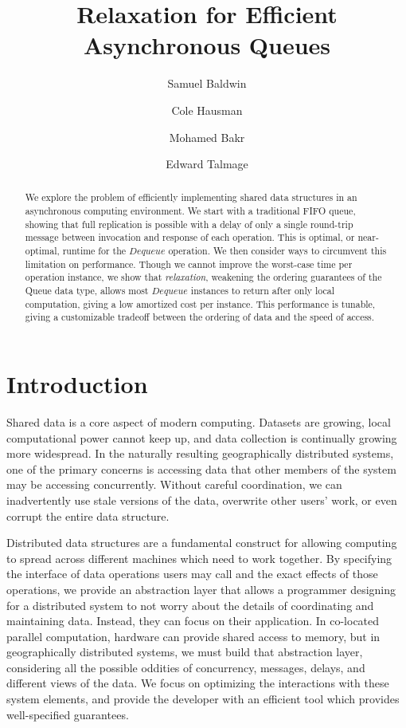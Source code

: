 \documentclass[a4paper,anonymous,USenglish]{lipics-v2021}
\title{Relaxation for Efficient Asynchronous Queues}
\author{Samuel Baldwin}{Bucknell University, USA}{}{https://orcid.org/0009-0009-0272-759X}{}
\author{Cole Hausman}{Bucknell University, USA}{}{}{}
\author{Mohamed Bakr}{Bucknell University, USA}{}{}{}
\author{Edward Talmage}{Bucknell Univserity, USA}{elt006@bucknell.edu}{https://orcid.org/0009-0001-9108-6190}{}
\theoremstyle{definition}
\begin{document}
\maketitle

\begin{abstract}
We explore the problem of efficiently implementing shared data structures in an asynchronous computing environment.  We start with a traditional FIFO queue, showing that full replication is possible with a delay of only a single round-trip message between invocation and response of each operation.  This is optimal, or near-optimal, runtime for the $Dequeue$ operation.  We then consider ways to circumvent this limitation on performance.  Though we cannot improve the worst-case time per operation instance, we show that \emph{relaxation}, weakening the ordering guarantees of the Queue data type, allows most $Dequeue$ instances to return after only local computation, giving a low amortized cost per instance.  This performance is tunable, giving a customizable tradeoff between the ordering of data and the speed of access.
\end{abstract}

\section{Introduction}

Shared data is a core aspect of modern computing.  Datasets are growing, local computational power cannot keep up, and data collection is continually growing more widespread.  In the naturally resulting geographically distributed systems, one of the primary concerns is accessing data that other members of the system may be accessing concurrently.  Without careful coordination, we can inadvertently use stale versions of the data, overwrite other users' work, or even corrupt the entire data structure.

Distributed data structures are a fundamental construct for allowing computing to spread across different machines which need to work together.  By specifying the interface of data operations users may call and the exact effects of those operations, we provide an abstraction layer that allows a programmer designing for a distributed system to not worry about the details of coordinating and maintaining data.  Instead, they can focus on their application.  In co-located parallel computation, hardware can provide shared access to memory, but in geographically distributed systems, we must build that abstraction layer, considering all the possible oddities of concurrency, messages, delays, and different views of the data.  We focus on optimizing the interactions with these system elements, and provide the developer with an efficient tool which provides well-specified guarantees.
\end{document}
